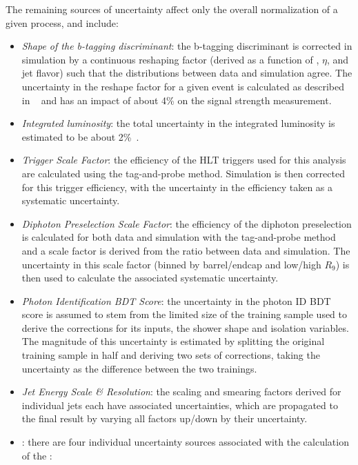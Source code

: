 The remaining sources of uncertainty affect only the overall normalization of a given process, and include:
\begin{itemize}
    \item \emph{Shape of the b-tagging discriminant}: the b-tagging discriminant is corrected in simulation by a continuous reshaping factor (derived as a function of \pT, $\eta$, and jet flavor) such that the distributions between data and simulation agree. The uncertainty in the reshape factor for a given event is calculated as described in ~\cite{Sirunyan_2018_deepcsv} and has an impact of about 4\% on the \ttH signal strength measurement.
    \item \emph{Integrated luminosity}: the total uncertainty in the integrated luminosity is estimated to be about 2\%~\cite{CMS-PAS-LUM-17-001,CMS-PAS-LUM-17-004,CMS-PAS-LUM-18-002}.
    \item \emph{Trigger Scale Factor}: the efficiency of the HLT triggers used for this analysis are calculated using the tag-and-probe method. Simulation is then corrected for this trigger efficiency, with the uncertainty in the efficiency taken as a systematic uncertainty.
    \item \emph{Diphoton Preselection Scale Factor}: the efficiency of the diphoton preselection is calculated for both data and simulation with the tag-and-probe method and a scale factor is derived from the ratio between data and simulation. The uncertainty in this scale factor (binned by barrel/endcap and low/high $R_9$) is then used to calculate the associated systematic uncertainty. 
    \item \emph{Photon Identification BDT Score}: the uncertainty in the photon ID BDT score is assumed to stem from the limited size of the training sample used to derive the corrections for its inputs, the shower shape and isolation variables. The magnitude of this uncertainty is estimated by splitting the original training sample in half and deriving two sets of corrections, taking the uncertainty as the difference between the two trainings.
    \item \emph{Jet Energy Scale \& Resolution}: the scaling and smearing factors derived for individual jets each have associated uncertainties, which are propagated to the final result by varying all factors up/down by their uncertainty.
    \item \emph{\met }: there are four individual uncertainty sources associated with the calculation of the \met:
    \begin{itemize}

\end{itemize}
\end{itemize}
